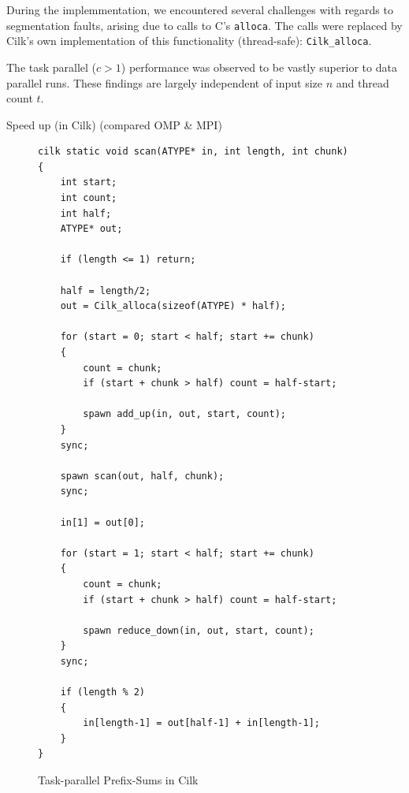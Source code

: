 \documentclass[11pt]{article}
\begin{document}
During the implemmentation, we encountered several challenges with regards to segmentation faults, arising due to calls to C's \verb=alloca=. The calls were replaced by Cilk's own implementation of this functionality (thread-safe): \verb=Cilk_alloca=.

The task parallel ($c > 1$) performance was observed to be vastly superior to data parallel runs. These findings are largely independent of input size $n$ and thread count $t$.

Speed up (in Cilk) (compared OMP \& MPI)



\begin{figure}[H]
\label{cilk_prefix_code}
\caption{Task-parallel Prefix-Sums in Cilk}
\begin{lstlisting}
cilk static void scan(ATYPE* in, int length, int chunk)
{
	int start;
	int count;
	int half;
	ATYPE* out;

	if (length <= 1) return;

	half = length/2;
	out = Cilk_alloca(sizeof(ATYPE) * half);

	for (start = 0; start < half; start += chunk) 
	{
		count = chunk;
		if (start + chunk > half) count = half-start;

		spawn add_up(in, out, start, count);
	}
	sync;

	spawn scan(out, half, chunk);
	sync;

	in[1] = out[0];

	for (start = 1; start < half; start += chunk) 
	{
		count = chunk;
		if (start + chunk > half) count = half-start;

		spawn reduce_down(in, out, start, count);
	}
	sync;

	if (length % 2)
	{
		in[length-1] = out[half-1] + in[length-1];
	}
}
\end{lstlisting}

\end{figure}
\end{document}
